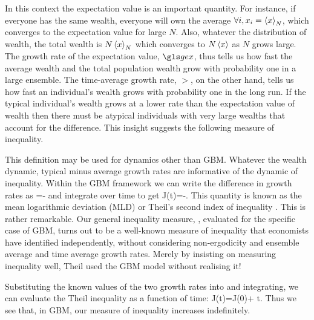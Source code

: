 In this context the expectation value is an important quantity. 
For instance, if everyone has the same wealth, everyone will own the average $\forall i, x_i=\left\langle x \right\rangle_N$,
which converges to the expectation value for large $N$. Also, whatever the distribution 
of wealth, the total wealth is $N\left\langle x \right\rangle_N$ which converges to $N\left\langle x \right\rangle$ as $N$ grows large. The growth 
rate of the expectation value, $\gex$, thus tells us how fast the average wealth and the 
total population wealth grow with probability one in a large ensemble. The time-average growth rate, $\gt$, on the other hand, tells us how fast an individual's wealth grows with probability one in 
the long run. If the typical individual's wealth grows at a lower rate than the 
expectation value of wealth then there must be atypical individuals with very large 
wealths that account for the difference. This insight suggests the following measure of 
inequality.


This definition may be used for dynamics other than
GBM. Whatever the wealth dynamic, typical minus average growth rates are informative of the
dynamic of inequality. Within the GBM framework we can write the difference in growth rates as 
\be
{}=-
\ee
and integrate over time to get
\be
J(t)=\ln {}-.
\ee
This quantity is known as the mean logarithmic deviation (MLD) or Theil's second index of inequality \cite{Theil1967}. 
This is rather remarkable. Our general inequality measure, , evaluated 
for the specific case of GBM, turns out to be a well-known measure of inequality that 
economists have identified independently, without considering non-ergodicity and ensemble 
average and time average growth rates. Merely by insisting on measuring inequality well,
Theil used the GBM model without realising it!

Substituting the known values of the two growth rates into  and integrating, we can evaluate the Theil inequality as a function of time:
\be
J(t)=J(0)+ t.
\ee
Thus we see that, in GBM, our measure of inequality increases indefinitely.

